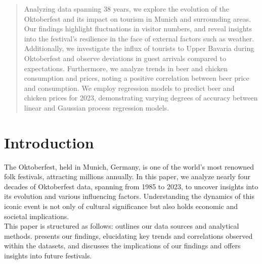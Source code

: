 \documentclass{article}
\theoremstyle{plain}
\theoremstyle{definition}
\theoremstyle{remark}
\begin{document}
\printAffiliationsAndNotice{\icmlEqualContribution} %

\begin{abstract}
Analyzing data spanning 38 years, we explore the evolution of the Oktoberfest and its impact on tourism in Munich and surrounding areas. Our findings highlight fluctuations in visitor numbers, and reveal insights into the festival's resilience in the face of external factors such as weather. Additionally, we investigate the influx of tourists to Upper Bavaria during Oktoberfest and observe deviations in guest arrivals compared to expectations. Furthermore, we analyze trends in beer and chicken consumption and prices, noting a positive correlation between beer price and consumption. We employ regression models to predict beer and chicken prices for 2023, demonstrating varying degrees of accuracy between linear and Gaussian process regression models.
\end{abstract}

\section{Introduction}\label{sec:intro}
The Oktoberfest, held in Munich, Germany, is one of the world's most renowned folk festivals, attracting millions annually. In this paper, we analyze nearly four decades of Oktoberfest data, spanning from 1985 to 2023, to uncover insights into its evolution and various influencing factors. Understanding the dynamics of this iconic event is not only of cultural significance but also holds economic and societal implications. \\
This paper is structured as follows:  outlines our data sources and analytical methods.  presents our findings, elucidating key trends and correlations observed within the datasets, and  discusses the implications of our findings and offers insights into future festivals.
\end{document}
